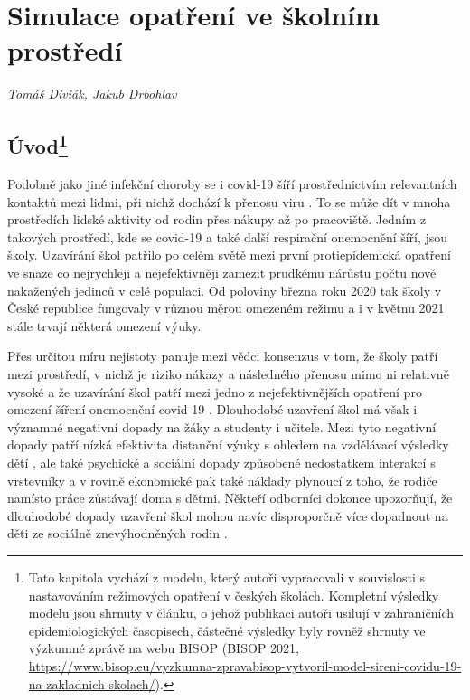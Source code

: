 
\chapter{Simulace opatření ve školním prostředí}\label{Skoly}

\textit{Tomáš Diviák, Jakub Drbohlav}
\vspace{15mm}

\section*{Úvod\footnote{Tato kapitola vychází z modelu, který autoři vypracovali v souvislosti s nastavováním režimových opatření v českých školách. Kompletní výsledky modelu jsou shrnuty v článku, o jehož publikaci autoři usilují v zahraničních epidemiologických časopisech, částečné výsledky byly rovněž shrnuty ve výzkumné zprávě na webu BISOP (BISOP 2021, \url{https://www.bisop.eu/vyzkumna-zpravabisop-vytvoril-model-sireni-covidu-19-na-zakladnich-skolach/}).}}

Podobně jako jiné infekční choroby se i covid-19 šíří prostřednictvím relevantních kontaktů mezi lidmi, při nichž dochází k přenosu viru \cite{pg:kucharski2020, vespignani2020modelling}. To se může dít v mnoha prostředích lidské aktivity od rodin přes nákupy až po pracoviště. Jedním z takových prostředí, kde se covid-19 a také další respirační onemocnění šíří, jsou školy. Uzavírání škol patřilo po celém světě mezi první protiepidemická opatření ve snaze co nejrychleji a nejefektivněji zamezit prudkému nárůstu počtu nově nakažených jedinců v celé populaci. Od poloviny března roku 2020 tak školy v České republice fungovaly v různou měrou omezeném režimu a i v květnu 2021 stále trvají některá omezení výuky.

Přes určitou míru nejistoty panuje mezi vědci konsenzus v tom, že školy patří mezi prostředí, v nichž je riziko nákazy a následného přenosu mimo ni relativně vysoké a že uzavírání škol patří mezi jedno z nejefektivnějších opatření pro omezení šíření onemocnění covid-19 \cite{Brauner_etal2020, lessler2021household, Haug_etal2020}. Dlouhodobé uzavření škol má však i významné negativní dopady na žáky a studenty i učitele. Mezi tyto negativní dopady patří nízká efektivita distanční výuky s ohledem na vzdělávací výsledky dětí \cite{engzell2021learning}, ale také psychické a sociální dopady způsobené nedostatkem interakcí s vrstevníky \cite{bignardi2020longitudinal, ravens2021impact} a v rovině ekonomické pak také náklady plynoucí z toho, že rodiče namísto práce zůstávají doma s dětmi. Někteří odborníci dokonce upozorňují, že dlouhodobé dopady uzavření škol mohou navíc disproporčně více dopadnout na děti ze sociálně znevýhodněných rodin \cite{di2020likely}.

